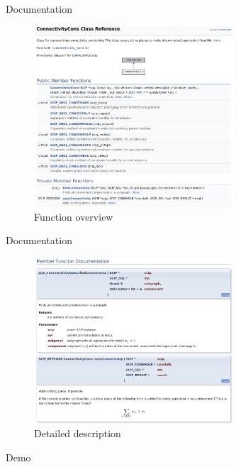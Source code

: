 \documentclass[fleqn]{beamer}
\begin{document}
    \begin{frame}{Documentation}
        \begin{figure}
            \centering
            \includegraphics[width=20em]{overviewdoc}
            \caption{Function overview}
        \end{figure}
    \end{frame}

    \begin{frame}{Documentation}
        \begin{figure}
            \centering
            \includegraphics[width=20em]{detaildoc}
            \caption{Detailed description}
        \end{figure}
    \end{frame}

    \begin{frame}[standout]
        Demo
    \end{frame}
\end{document}
